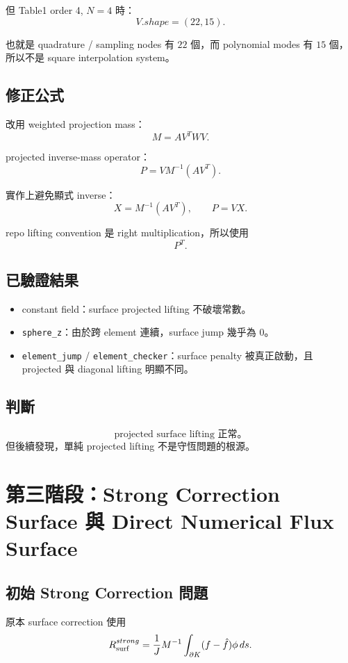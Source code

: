 \documentclass[UTF8,12pt,a4paper]{ctexart}
\begin{document}
但 Table1 order 4, $N=4$ 時：
\[
V.shape=(22,15).
\]

也就是 quadrature / sampling nodes 有 $22$ 個，而 polynomial modes 有 $15$ 個，所以不是 square interpolation system。

\subsection{修正公式}

改用 weighted projection mass：
\[
M=A V^T W V.
\]

projected inverse-mass operator：
\[
P
=
V M^{-1}(A V^T).
\]

實作上避免顯式 inverse：
\[
X=M^{-1}(A V^T),
\qquad
P=VX.
\]

repo lifting convention 是 right multiplication，所以使用
\[
P^T.
\]

\subsection{已驗證結果}

\begin{itemize}
  \item constant field：surface projected lifting 不破壞常數。
  \item \texttt{sphere\_z}：由於跨 element 連續，surface jump 幾乎為 $0$。
  \item \texttt{element\_jump} / \texttt{element\_checker}：surface penalty 被真正啟動，且 projected 與 diagonal lifting 明顯不同。
\end{itemize}

\subsection{判斷}

\[
\boxed{
\text{projected surface lifting 正常。}
}
\]
但後續發現，單純 projected lifting 不是守恆問題的根源。

\section{第三階段：Strong Correction Surface 與 Direct Numerical Flux Surface}

\subsection{初始 Strong Correction 問題}

原本 surface correction 使用
\[
R_{\rm surf}^{strong}
=
\frac{1}{J}
M^{-1}
\int_{\partial K}
(f-\hat f)\phi\,ds.
\]
\end{document}
